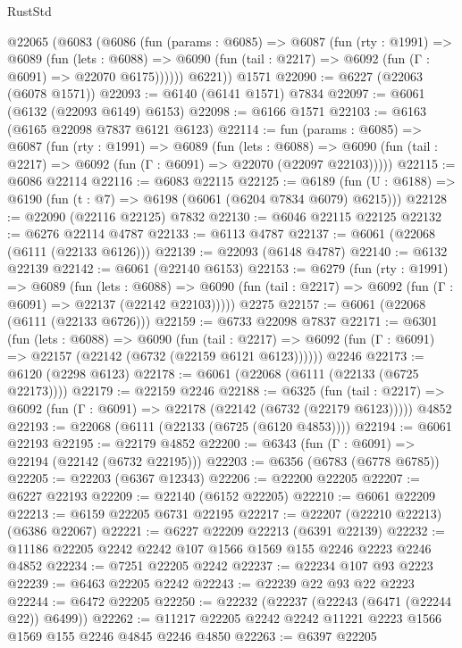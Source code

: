 \begin{lexlean}{RustStd}
\begin{coremodule}
    @22065
      (@6083
        (@6086
          (fun (params : @6085) =>
          @6087
            (fun (rty : @1991) =>
            @6089
              (fun (lets : @6088) =>
              @6090 (fun (tail : @2217) => @6092 (fun (Γ : @6091) => @22070 @6175))))))
        @6221))
    @1571
@22090 := @6227 (@22063 (@6078 @1571))
@22093 := @6140 (@6141 @1571) @7834
@22097 := @6061 (@6132 (@22093 @6149) @6153)
@22098 := @6166 @1571
@22103 := @6163 (@6165 @22098 @7837 @6121 @6123)
@22114 := fun (params : @6085) =>
  @6087
    (fun (rty : @1991) =>
    @6089
      (fun (lets : @6088) =>
      @6090 (fun (tail : @2217) => @6092 (fun (Γ : @6091) => @22070 (@22097 @22103)))))
@22115 := @6086 @22114
@22116 := @6083 @22115
@22125 := @6189 (fun (U : @6188) => @6190 (fun (t : @7) => @6198 (@6061 (@6204 @7834 @6079) @6215)))
@22128 := @22090 (@22116 @22125) @7832
@22130 := @6046 @22115 @22125
@22132 := @6276 @22114 @4787
@22133 := @6113 @4787
@22137 := @6061 (@22068 (@6111 (@22133 @6126)))
@22139 := @22093 (@6148 @4787)
@22140 := @6132 @22139
@22142 := @6061 (@22140 @6153)
@22153 := @6279
    (fun (rty : @1991) =>
    @6089
      (fun (lets : @6088) =>
      @6090 (fun (tail : @2217) => @6092 (fun (Γ : @6091) => @22137 (@22142 @22103)))))
    @2275
@22157 := @6061 (@22068 (@6111 (@22133 @6726)))
@22159 := @6733 @22098 @7837
@22171 := @6301
    (fun (lets : @6088) =>
    @6090
      (fun (tail : @2217) =>
      @6092 (fun (Γ : @6091) => @22157 (@22142 (@6732 (@22159 @6121 @6123))))))
    @2246
@22173 := @6120 (@2298 @6123)
@22178 := @6061 (@22068 (@6111 (@22133 (@6725 @22173))))
@22179 := @22159 @2246
@22188 := @6325
    (fun (tail : @2217) => @6092 (fun (Γ : @6091) => @22178 (@22142 (@6732 (@22179 @6123)))))
    @4852
@22193 := @22068 (@6111 (@22133 (@6725 (@6120 @4853))))
@22194 := @6061 @22193
@22195 := @22179 @4852
@22200 := @6343 (fun (Γ : @6091) => @22194 (@22142 (@6732 @22195)))
@22203 := @6356 (@6783 (@6778 @6785))
@22205 := @22203 (@6367 @12343)
@22206 := @22200 @22205
@22207 := @6227 @22193
@22209 := @22140 (@6152 @22205)
@22210 := @6061 @22209
@22213 := @6159 @22205 @6731 @22195
@22217 := @22207 (@22210 @22213) (@6386 @22067)
@22221 := @6227 @22209 @22213 (@6391 @22139)
@22232 := @11186 @22205 @2242 @2242 @107 @1566 @1569 @155 @2246 @2223 @2246 @4852
@22234 := @7251 @22205 @2242
@22237 := @22234 @107 @93 @2223
@22239 := @6463 @22205 @2242
@22243 := @22239 @22 @93 @22 @2223
@22244 := @6472 @22205
@22250 := @22232 (@22237 (@22243 (@6471 (@22244 @22)) @6499))
@22262 := @11217 @22205 @2242 @2242 @11221 @2223 @1566 @1569 @155 @2246 @4845 @2246 @4850
@22263 := @6397 @22205

\end{coremodule}
\end{lexlean}
